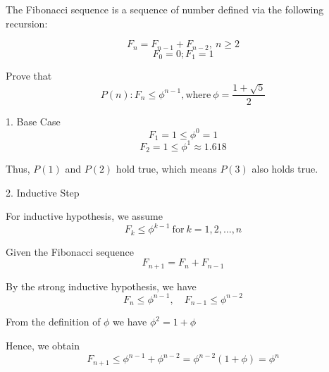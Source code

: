 \begin{eg}
  The Fibonacci sequence is a sequence of number defined via the following recursion: 
  
  \[
  F_n = F_{n-1} + F_{n-2},\ n \geq 2
  \]
  \[
    F_0 = 0; F_1 = 1
  \]
  
  Prove that \[
  P(n): F_n \leq \phi^{n-1}, \text{where}\ \phi = \dfrac{1 + \sqrt{5}}{2}
  \]

  1. Base Case
  \[
    F_1 = 1 \leq \phi^0 = 1
  \]
  \[
    F_2 = 1 \leq \phi^1 \approx 1.618
  \]

  Thus, \(P(1)\) and \(P(2)\) hold true, which means \(P(3)\) also holds true. 

  2. Inductive Step

  For inductive hypothesis, we assume \[F_k \leq \phi^{k-1}\ \text{for}\ k = 1, 2, \dots, n\]
  
  Given the Fibonacci sequence 
  \[
    F_{n+1} = F_n + F_{n-1}
  \]

  By the strong inductive hypothesis, we have 
  \[
    F_n \leq \phi^{n-1},\quad F_{n-1} \leq \phi^{n-2}
  \]

  From the definition of \(\phi\) we have \(\phi^2 = 1 + \phi\) 

  Hence, we obtain
  \[
    F_{n+1} \leq \phi^{n-1} + \phi^{n-2} = \phi^{n-2}(1 + \phi) = \phi^n
  \]

   

\end{eg}

